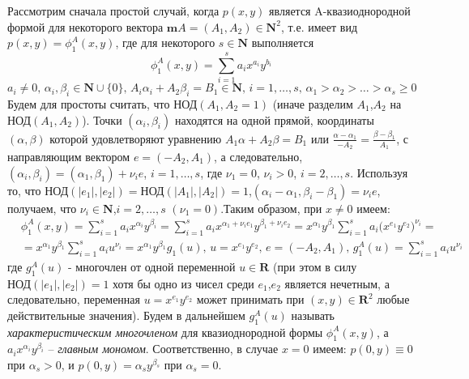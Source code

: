 Рассмотрим сначала простой случай, когда $p(x,y)$ является A-квазиоднородной формой  для некоторого вектора $\mathbf{m}A=(A_1,A_2)\in\mathbf{N}^2$, т.е. имеет вид $p(x,y)=\phi^A_{1}(x,y)$, где для некоторого $s\in\mathbf{N}$ выполняется \begin{equation}\label{nef:eq:2}
	\phi^{A}_{1}(x,y)=\sum_{i=1}^{s}a_{i}x^{a_{i}}y^{b_{i}}
\end{equation}
\begin{equation}\label{nef:eq:3} 
	a_i\neq0,\,  \alpha_i,\beta_i\in\mathbf{N}\cup \{0\},\, A_i\alpha_i+A_2\beta_i=B_1\in\mathbf{N},\,i=1,\dots,s,\,   \alpha_1>\alpha_2>\ldots>\alpha_s\geq0
\end{equation}
Будем для простоты считать, что $\text{НОД}(A_1,A_2=1)$ (иначе разделим $A_1$,$A_2$ на $\text{НОД}(A_1,A_2)$). Точки $(\alpha_i,\beta_i)$ находятся на одной прямой, координаты $(\alpha,\beta)$  которой удовлетворяют уравнению $A_1\alpha+A_2\beta=B_1$ или $\frac{\alpha-\alpha_1}{-A_2}=\frac{\beta-\beta_1}{A_1}$, с направляющим вектором $e=(-A_2,A_1)$, а следовательно, $(\alpha_i,\beta_i)=(\alpha_1,\beta_1)+\nu_ie$, $i=1,\ldots,s$, где $\nu_1=0$, $\nu_i>0$, $i=2,\ldots,s$. Используя то, что $\text{НОД}(|e_1|,|e_2|)=\text{НОД}(|A_1|,|A_2|)=1$,$(\alpha_i-\alpha_1,\beta_i-\beta_1)=\nu_ie$, получаем, что $\nu_i\in\mathbf{N}$,$i=2,\ldots,s$ $(\nu_1=0)$.Таким образом, при $x\not=0$ имеем:
\begin{equation}\label{nef:eq:4} 
	\begin{aligned}
		&\phi^A_1(x,y)=\sum_{i=1}^{s}a_ix^{\alpha_i}y^{\beta_i}=\sum_{i=1}^{s}a_ix^{\alpha_1+\nu_ie_1}y^{\beta_1+\nu_ie_2}=x^{\alpha_1}y^{\beta_1}\sum_{i=1}^{s}a_i\big(x^{e_1}y^{e_2}\big)^{\nu_i}=\\
		&=x^{\alpha_1}y^{\beta_1}\sum_{i=1}^{s}a_iu^{\nu_i}=x^{\alpha_1}y^{\beta_1}g_1(u),\,u=x^{e_1}y^{e_2},\,e=(-A_2,A_1),\, g^A_1(u)=\sum_{i=1}^{s}a_iu^{\nu_i}
	\end{aligned}
\end{equation}
где $g^A_1(u)$ - многочлен от одной переменной  $u\in\mathbf{R}$ (при этом в силу $\text{НОД}(|e_1|,|e_2|)=1$ хотя бы одно из чисел среди $e_1$,$e_2$  является нечетным, а следовательно, переменная $u=x^{e_1}y^{e_2}$  может принимать при $(x,y)\in\mathbf{R}^2$  любые действительные значения). Будем в дальнейшем $g^A_1(u)$ называть \emph{характеристическим многочленом} для квазиоднородной формы $\phi^A_1(x,y)$, а $a_ix^{\alpha_i}y^{\beta_i}$ – \emph{главным мономом}. Соответственно, в случае $x=0$ имеем: $p(0,y)\equiv0$ при $\alpha_s>0$,  и $p(0,y)=\alpha_sy^{\beta_s}$ при $\alpha_s=0$.

